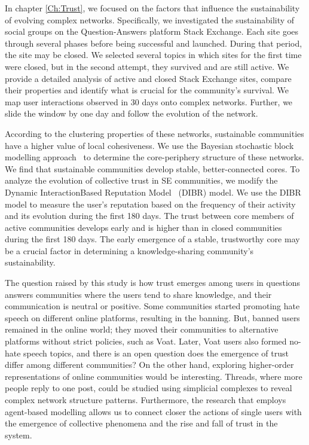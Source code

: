In chapter \ref{Ch:Trust}, we focused on the factors that influence the sustainability of evolving complex networks. Specifically, we investigated the sustainability of social groups on the Question-Answers platform Stack Exchange. 
Each site goes through several phases before being successful and launched. During that period, the site may be closed. We selected several topics in which sites for the first time were closed, but in the second attempt, they survived and are still active. We provide a detailed analysis of active and closed Stack Exchange sites, compare their properties and identify what is crucial for the community's survival. We map user interactions observed in 30 days onto complex networks. Further, we slide the window by one day and follow the evolution of the network. 

According to the clustering properties of these networks, sustainable communities have a higher value of local cohesiveness. We use the Bayesian stochastic block modelling approach~\cite{gallagher2020clarified} to determine the core-periphery structure of these networks. We find that sustainable communities develop stable, better-connected cores. To analyze the evolution of collective trust in SE communities, we modify the Dynamic InteractionBased Reputation Model~\cite{melnikov2018toward} (DIBR) model. We use the DIBR model to measure the user's reputation based on the frequency of their activity and its evolution during the first 180 days. The trust between core members of active communities develops early and is higher than in closed communities during the first 180 days. The early emergence of a stable, trustworthy core may be a crucial factor in determining a knowledge-sharing community's sustainability. 

The question raised by this study is how trust emerges among users in questions answers communities where the users tend to share knowledge, and their communication is neutral or positive. Some communities started promoting hate speech on different online platforms, resulting in the banning. But, banned users remained in the online world; they moved their communities to alternative platforms without strict policies, such as Voat. Later, Voat users also formed no-hate speech topics, and there is an open question does the emergence of trust differ among different communities? On the other hand, exploring higher-order representations of online communities would be interesting. Threads, where more people reply to one post, could be studied using simplicial complexes to reveal complex network structure patterns. Furthermore, the research that employs agent-based modelling allows us to connect closer the actions of single users with the emergence of collective phenomena and the rise and fall of trust in the system. 

